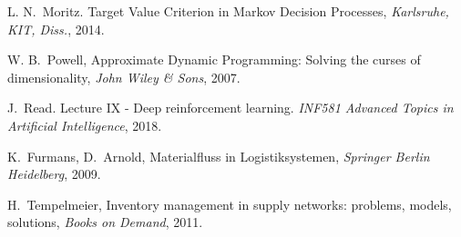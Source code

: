 \documentclass[journal, a4paper]{IEEEtran}
\theoremstyle{plain}
\theoremstyle{definition}
\begin{document}
\begin{thebibliography}{4}

	L. N.~Moritz. Target Value Criterion in Markov Decision Processes,
	\textit{Karlsruhe, KIT, Diss.}, 2014.

	W. B.~Powell,  Approximate Dynamic Programming: Solving the curses of dimensionality,
	{\em John Wiley \& Sons}, 2007.

	J.~Read. Lecture IX - Deep reinforcement learning. \textit{INF581 Advanced Topics in Artificial Intelligence}, 2018.

	K.~Furmans, D.~Arnold, Materialfluss in Logistiksystemen,
	{\em Springer Berlin Heidelberg}, 2009.

	H.~Tempelmeier, Inventory management in supply networks: problems, models, solutions,
	{\em Books on Demand}, 2011.
	
	





\end{thebibliography}

\end{document}
